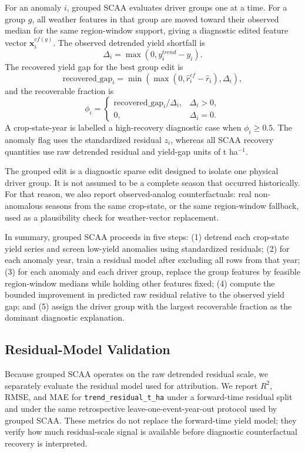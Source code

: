 \documentclass[11pt]{article}
\begin{document}
For an anomaly $i$, grouped SCAA evaluates driver groups one at a time. For a group
$g$, all weather features in that group are moved toward their observed median for the
same region-window support, giving a diagnostic edited feature vector
$\bm{x}^{cf(g)}_i$. The observed detrended yield shortfall is
\begin{equation}
  \Delta_i = \max(0, y^{trend}_i - y_i).
\end{equation}
The recovered yield gap for the best group edit is
\begin{equation}
  \mathrm{recovered\_gap}_{i} =
  \min\left(\max(0, \hat r^{cf}_i - \hat r_i), \Delta_i\right),
\end{equation}
and the recoverable fraction is
\begin{equation}
  \phi_i =
  \begin{cases}
    \mathrm{recovered\_gap}_{i}/\Delta_i, & \Delta_i > 0,\\
    0, & \Delta_i = 0.
  \end{cases}
\end{equation}
A crop-state-year is labelled a high-recovery diagnostic case when $\phi_i \geq 0.5$.
The anomaly flag uses the standardized residual $z_i$, whereas all SCAA recovery
quantities use raw detrended residual and yield-gap units of t ha$^{-1}$.

The grouped edit is a diagnostic sparse edit designed to isolate one physical driver
group. It is not assumed to be a complete season that occurred historically. For that
reason, we also report observed-analog counterfactuals: real non-anomalous seasons
from the same crop-state, or the same region-window fallback, used as a plausibility
check for weather-vector replacement.

In summary, grouped SCAA proceeds in five steps: (1) detrend each crop-state yield
series and screen low-yield anomalies using standardized residuals; (2) for each
anomaly year, train a residual model after excluding all rows from that year; (3) for
each anomaly and each driver group, replace the group features by feasible
region-window medians while holding other features fixed; (4) compute the bounded
improvement in predicted raw residual relative to the observed yield gap; and (5)
assign the driver group with the largest recoverable fraction as the dominant
diagnostic explanation.

\subsection{Residual-Model Validation}
Because grouped SCAA operates on the raw detrended residual scale, we separately
evaluate the residual model used for attribution. We report $R^2$, RMSE, and MAE for
\texttt{trend\_residual\_t\_ha} under a forward-time residual split and under the same
retrospective leave-one-event-year-out protocol used by grouped SCAA. These metrics do
not replace the forward-time yield model; they verify how much residual-scale signal is
available before diagnostic counterfactual recovery is interpreted.
\end{document}
